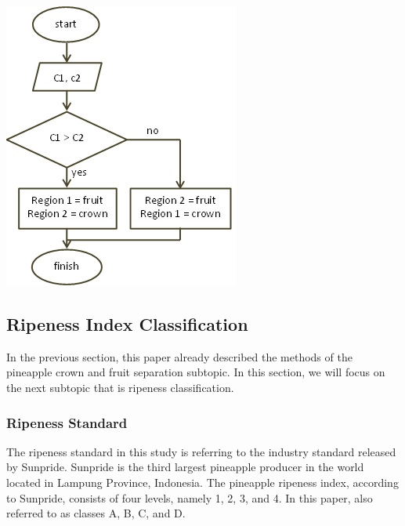 \documentclass[11pt]{article}
\begin{document}
\begin{linenumbers}
\begin{center}
	\includegraphics[scale=0.73]{images/fruit-recognition-flowchart}
\end{center}

\subsection{Ripeness Index Classification}
In the previous section, this paper already described the methods of the pineapple crown and fruit separation subtopic. In this section, we will focus on the next subtopic that is ripeness classification. 
	
\subsubsection{Ripeness Standard}
The ripeness standard in this study is referring to the industry standard released by Sunpride. Sunpride is the third largest pineapple producer in the world located in Lampung Province, Indonesia. The pineapple ripeness index, according to Sunpride, consists of four levels, namely 1, 2, 3, and 4. In this paper, also referred to as classes A, B, C, and D.


\end{linenumbers}
\end{document}
